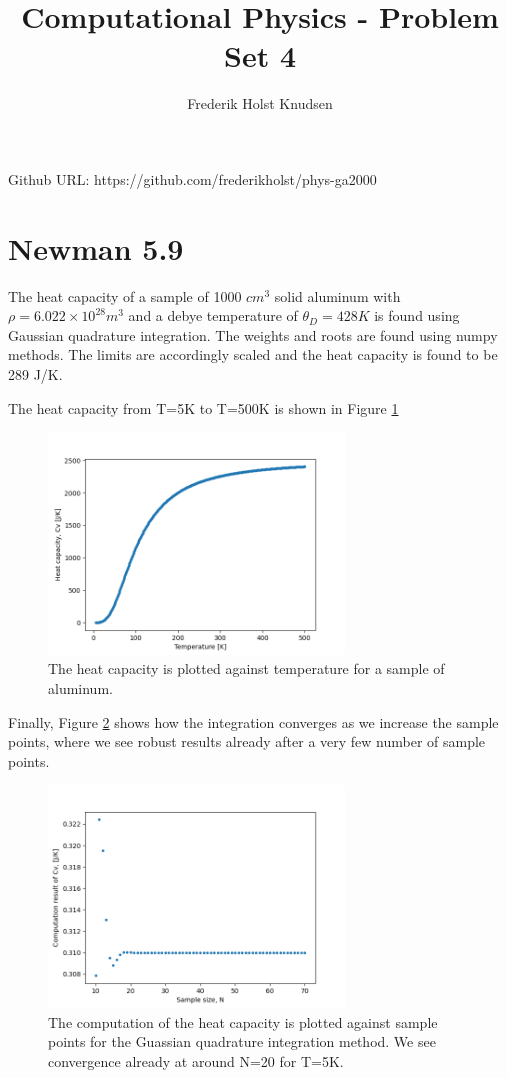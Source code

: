 \documentclass[11pt]{article}
\title{Computational Physics -  Problem Set 4}
\author{Frederik Holst Knudsen}
\begin{document}
\maketitle
Github URL: https://github.com/frederikholst/phys-ga2000
\section{Newman 5.9}
The heat capacity of a sample of 1000 $cm^3$ solid aluminum with $\rho =6.022 \times 10^{28}m^3$ and a debye temperature of $\theta_D = 428K$ is found using Gaussian quadrature integration. The weights and roots are found using numpy methods. The limits are accordingly scaled and the heat capacity is found to be 289 J/K.

The heat capacity from T=5K to T=500K is shown in Figure \ref{T-series}

\begin{figure}[!htbp]
    \centering
    \includegraphics[width=0.7\textwidth]{T_series.png}
    \caption{The heat capacity is plotted against temperature for a sample of aluminum.}
    \label{T-series}
\end{figure}

Finally, Figure \ref{Conv} shows how the integration converges as we increase the sample points, where we see robust results already after a very few number of sample points. 

\begin{figure}[!htbp]
    \centering
    \includegraphics[width=0.7\textwidth]{Convergence.png}
    \caption{The computation of the heat capacity is plotted against sample points for the Guassian quadrature integration method. We see convergence already at around N=20 for T=5K. }
    \label{Conv}
\end{figure}
\end{document}
